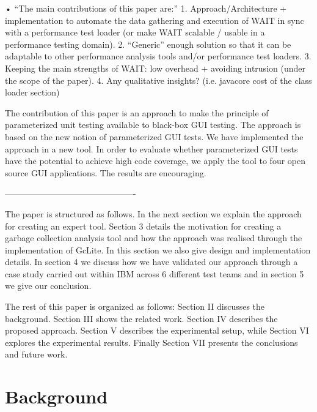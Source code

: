 \documentclass[runningheads,a4paper]{llncs}
\begin{document}
•	“The main contributions of this paper are:”
1. Approach/Architecture + implementation to automate the data gathering and execution of WAIT in sync with a performance test loader (or make WAIT scalable / usable in a performance testing domain).
2. “Generic” enough solution so that it can be adaptable to other performance analysis tools and/or performance test loaders.
3. Keeping the main strengths of WAIT: low overhead + avoiding intrusion (under the scope of the paper).
4. Any qualitative insights? (i.e. javacore cost of the class loader section)

The contribution of this paper is an approach to make the principle of
parameterized unit testing available to black-box GUI testing. The approach is based on the new notion of
parameterized GUI tests. We have implemented the approach in a new tool. In
order to evaluate whether parameterized GUI tests have the potential to achieve high code coverage, we apply the tool to four open
source GUI applications. The results are encouraging.

----------------------------------------------

The paper is structured as follows. In the next section we explain the approach
for creating an expert tool. Section 3 details the motivation for creating a garbage 
collection analysis tool and how the approach was realised through the implementation of 
GcLite. In this section we also give design and implementation details. In section 4 we 
discuss how we have validated our approach through a case study carried out within IBM 
across 6 different test teams and in section 5 we give our conclusion.

The rest of this paper is organized as follows: Section
II discusses the background. Section III shows the related work. Section IV describes the 
proposed approach. Section V describes the experimental setup, while Section VI explores 
the experimental results. Finally Section VII presents the conclusions and future work.




\section{Background}
\end{document}
